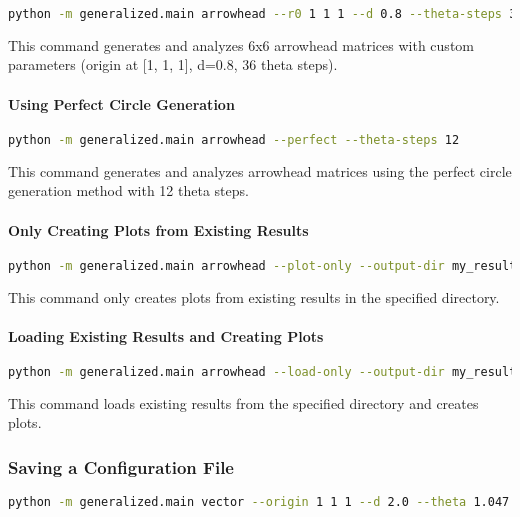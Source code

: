 \begin{lstlisting}[language=bash]
python -m generalized.main arrowhead --r0 1 1 1 --d 0.8 --theta-steps 36 --size 6
\end{lstlisting}

This command generates and analyzes 6x6 arrowhead matrices with custom parameters (origin at [1, 1, 1], d=0.8, 36 theta steps).

\paragraph{Using Perfect Circle Generation}

\begin{lstlisting}[language=bash]
python -m generalized.main arrowhead --perfect --theta-steps 12
\end{lstlisting}

This command generates and analyzes arrowhead matrices using the perfect circle generation method with 12 theta steps.

\paragraph{Only Creating Plots from Existing Results}

\begin{lstlisting}[language=bash]
python -m generalized.main arrowhead --plot-only --output-dir my_results
\end{lstlisting}

This command only creates plots from existing results in the specified directory.

\paragraph{Loading Existing Results and Creating Plots}

\begin{lstlisting}[language=bash]
python -m generalized.main arrowhead --load-only --output-dir my_results
\end{lstlisting}

This command loads existing results from the specified directory and creates plots.

\subsubsection{Saving a Configuration File}

\begin{lstlisting}[language=bash]
python -m generalized.main vector --origin 1 1 1 --d 2.0 --theta 1.047 --save-config config.json
\end{lstlisting}


